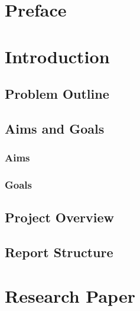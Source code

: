\documentclass[12pt,leqno]{report}
\begin{document}

\sloppy
\title{}
\author{\LARGE{Valentin Gorbunov}}
\maketitle

\begin{abstract}

  A brief summary.
  \thefontsize{}
  
\end{abstract}


\tableofcontents

\chapter{Preface}

\chapter{Introduction}

\section{Problem Outline}

\section{Aims and Goals}
\subsection{Aims}
\subsection{Goals}
\section{Project Overview}
\section{Report Structure}

\chapter{Research Paper}
\end{document}
